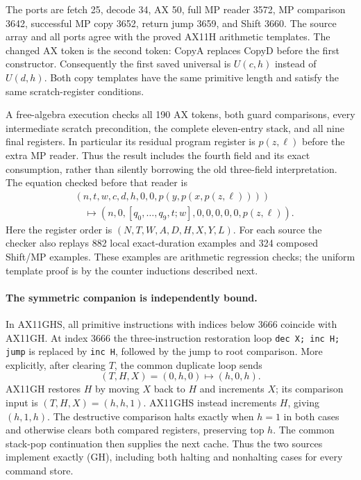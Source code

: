 The ports are fetch 25, decode 34, AX 50, full MP reader 3572,
MP comparison 3642, successful MP copy 3652, return jump 3659, and
Shift 3660.  The source array and all ports agree with the proved AX11H
arithmetic templates.  The changed AX token is the second token: CopyA
replaces CopyD before the first constructor.  Consequently the first saved
universal is $U(c,h)$ instead of $U(d,h)$.  Both copy templates have the
same primitive length and satisfy the same scratch-register conditions.

A free-algebra execution checks all 190 AX tokens, both guard comparisons,
every intermediate scratch precondition, the complete eleven-entry stack,
and all nine final registers.  In particular its residual program register
is $p(z,\ell)$ before the extra MP reader.  Thus the result includes the
fourth field and its exact consumption, rather than silently borrowing the
old three-field interpretation.  The equation checked before that reader is
\[
\begin{split}
 &(n,t,w,c,d,h,0,0,p(y,p(x,p(z,\ell))))\\
 &\quad\longmapsto
 (n,0,[q_0,\ldots,q_9,t;w],0,0,0,0,0,p(z,\ell)).
\end{split}\tag{AX-end}
\]
Here the register order is $(N,T,W,A,D,H,X,Y,L)$.
For each source the checker also replays 882 local exact-duration examples
and 324 composed Shift/MP examples.  These examples are arithmetic regression checks; the
uniform template proof is by the counter inductions described next.

\paragraph{The symmetric companion is independently bound.}
In AX11GHS, all primitive instructions with indices below 3666 coincide
with AX11GH.  At index 3666 the three-instruction restoration loop
\texttt{dec X; inc H; jump} is replaced by \texttt{inc H}, followed by
the jump to root comparison.  More explicitly, after clearing $T$, the
common duplicate loop sends
\[
 (T,H,X)=(0,h,0)\longmapsto(h,0,h).
\]
AX11GH restores $H$ by moving $X$ back to $H$ and increments $X$;
its comparison input is $(T,H,X)=(h,h,1)$.  AX11GHS instead increments
$H$, giving $(h,1,h)$.  The destructive comparison halts exactly when
$h=1$ in both cases and otherwise clears both compared registers,
preserving top $h$.  The common stack-pop continuation then supplies
the next cache.  Thus the two sources implement exactly (GH), including
both halting and nonhalting cases for every command store.


